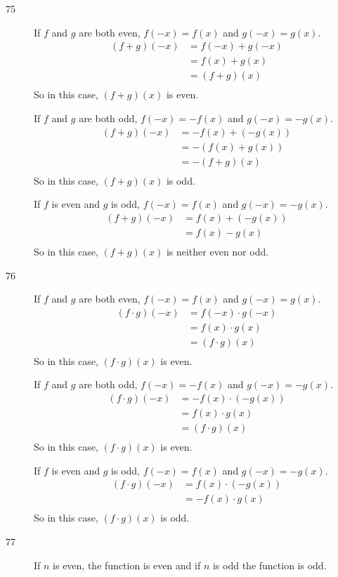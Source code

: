 \documentclass{exam}
\begin{document}
  \begin{description}
    \item[75]
      If $f$ and $g$ are both even, $f(-x) = f(x)$ and $g(-x) = g(x)$.  
      \begin{align*}
        (f + g)(-x) &= f(-x) + g(-x) \\
          &= f(x) + g(x) \\
          &= (f + g)(x) \\
      \end{align*}
      So in this case, $(f + g)(x)$ is even.

      If $f$ and $g$ are both odd, $f(-x) = -f(x)$ and $g(-x) = -g(x)$.  
      \begin{align*}
        (f + g)(-x) &= -f(x) + (-g(x)) \\
          &= - (f(x) + g(x)) \\
          &= -(f + g)(x) \\
      \end{align*}
      So in this case, $(f + g)(x)$ is odd.

      If $f$ is even and $g$ is odd, $f(-x) = f(x)$ and $g(-x) = -g(x)$.  
      \begin{align*}
        (f + g)(-x) &= f(x) + (-g(x)) \\
          &= f(x) - g(x) \\
      \end{align*}
      So in this case, $(f + g)(x)$ is neither even nor odd.

    \item[76]
      If $f$ and $g$ are both even, $f(-x) = f(x)$ and $g(-x) = g(x)$.  
      \begin{align*}
        (f \cdot g)(-x) &= f(-x) \cdot g(-x) \\
          &= f(x) \cdot g(x) \\
          &= (f \cdot g)(x) \\
      \end{align*}
      So in this case, $(f \cdot g)(x)$ is even.

      If $f$ and $g$ are both odd, $f(-x) = -f(x)$ and $g(-x) = -g(x)$.  
      \begin{align*}
        (f \cdot g)(-x) &= -f(x) \cdot (-g(x)) \\
          &= f(x) \cdot g(x) \\
          &= (f \cdot g)(x) \\
      \end{align*}
      So in this case, $(f \cdot g)(x)$ is even.

      If $f$ is even and $g$ is odd, $f(-x) = f(x)$ and $g(-x) = -g(x)$.  
      \begin{align*}
        (f \cdot g)(-x) &= f(x) \cdot (-g(x)) \\
          &= - f(x) \cdot g(x) \\
      \end{align*}
      So in this case, $(f \cdot g)(x)$ is odd.

    \item[77]
      If $n$ is even, the function is even and if $n$ is odd the function is odd.

  \end{description}
\end{document}
